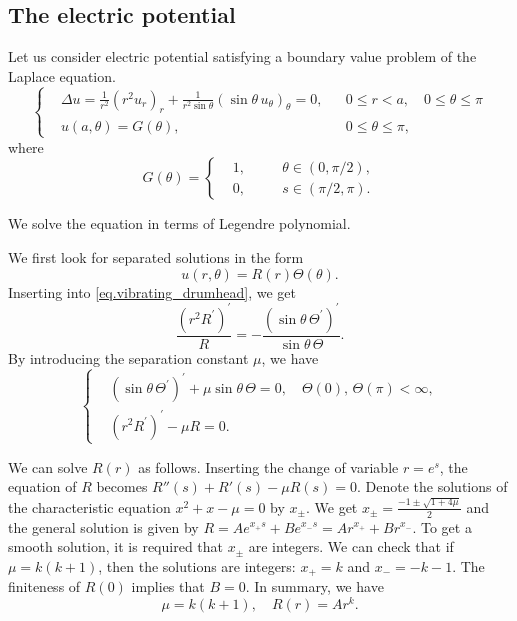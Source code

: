 \subsection{The electric potential}
Let us consider electric potential satisfying a boundary value problem of the Laplace equation.
\begin{equation}\label{eq.electric_potential}
\left\{\begin{aligned}
    &\Delta u=\frac{1}{r^2} \left(r^2 u_r\right)_r + \frac{1}{r^2\sin\theta} \left(\sin \theta\, u_{\theta}\right)_{\theta} = 0, && 0 \leq r<a, \quad 0\le \theta \le \pi
    \\
    &u(a, \theta)=G(\theta), && 0\le \theta \le \pi, 
\end{aligned}\right.
\end{equation}
where
\begin{equation}\label{eq.electric_potential_boundary}
G(\theta)=\left\{\begin{aligned}
    &1, &&\theta\in (0, \pi/2),
    \\ 
    &0,\quad &&s\in (\pi/2, \pi).
\end{aligned}\right.
\end{equation}

We solve the equation in terms of Legendre polynomial. 

We first look for separated solutions in the form
$$
u(r, \theta)=R(r) \Theta(\theta).
$$
Inserting into \eqref{eq.vibrating_drumhead}, we get
$$
    \frac{(r^2 R^{\prime})^{\prime}}{R} = - \frac{(\sin\theta\,\Theta^{\prime})^{\prime}}{\sin\theta\,\Theta}.
$$
By introducing the separation constant $\mu$, we have
\begin{equation}
\left\{\begin{aligned}
    &(\sin\theta\,\Theta^{\prime})^{\prime}+\mu \sin\theta\,\Theta=0, \quad \Theta(0),\, \Theta(\pi)  < \infty, 
    \\
    &(r^2 R^{\prime})^{\prime} - \mu R = 0.
\end{aligned}
\right.
\end{equation}

We can solve $R(r)$ as follows. Inserting the change of variable $r = e^s$, the equation of $R$ becomes $R''(s) + R'(s) - \mu R(s) = 0$. Denote the solutions of the characteristic equation $x^2 + x - \mu = 0$ by $x_{\pm}$. We get $x_{\pm} = \frac{-1 \pm \sqrt{1 + 4\mu}}{2}$ and the general solution is given by $R = Ae^{x_+ s} + Be^{x_- s} = Ar^{x_+} + Br^{x_-}$. To get a smooth solution, it is required that $x_{\pm}$ are integers. We can check that if $\mu = k(k+1)$, then the solutions are integers: $x_+ = k$ and $x_- = -k-1$. The finiteness of $R(0)$ implies that $B = 0$. In summary, we have 
\begin{equation}
    \mu = k(k+1),\quad R(r) = Ar^{k}.
\end{equation}

